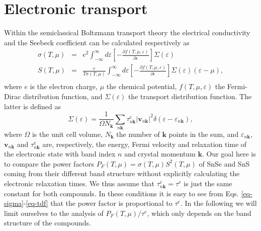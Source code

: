 \section{Electronic transport}

Within the semiclassical Boltzmann transport theory\cite{scheidemantel2003transport} the electrical conductivity and the Seebeck coefficient can be calculated respectively as
\begin{eqnarray}
 \sigma(T,\mu) & = & e^2 \int_{-\infty}^{\infty} d\varepsilon \left[-\frac{\partial f(T,\mu,\varepsilon)}{\partial\epsilon}\right] \Sigma(\varepsilon) 
 \label{eq-sigma}\\
 S(T,\mu) & = & \frac{e}{T\sigma(T,\mu)} \int_{-\infty}^{\infty} d\varepsilon \left[-\frac{\partial f(T,\mu,\varepsilon)}{\partial\epsilon}\right] \Sigma(\varepsilon) (\varepsilon - \mu), \nonumber \\
\label{eq-s}
\end{eqnarray}
where $e$ is the electron charge,  $\mu$ the chemical potential, $ f(T,\mu,\varepsilon)$ the Fermi-Dirac distribution function, and $\Sigma(\varepsilon)$ the transport distribution function. The latter is defined as
\begin{equation}
\Sigma(\varepsilon) = \frac{1}{\Omega N_{\mathbf{k}}} \sum_{n\mathbf{k}} \tau^e_{n\mathbf{k}}  |\mathbf{v}_{n\mathbf{k}}|^{2} \delta( \varepsilon-\varepsilon_{n\mathbf{k}} ), 
\label{eq-tdf}
\end{equation}
where $\Omega$ is the unit cell volume, $N_{\mathbf{k}}$ the number of $\mathbf{k}$ points in the sum, and $\varepsilon_{n\mathbf{k}} $, $\mathbf{v}_{n\mathbf{k}} $ and  $\tau^e_{n\mathbf{k}}$ are, respectively, the energy, Fermi
velocity and relaxation time of the electronic state with band index $n$ and crystal momentum $\mathbf{k}$. Our goal here is to compare the power factors $P_{F}(T,\mu)=\sigma(T,\mu) S^2(T,\mu)$ of SnSe and SnS coming from
their different band structure without explicitly calculating the electronic relaxation times. We thus assume that $\tau^e_{n\mathbf{k}}=\tau^e$ is just the same constant for both compounds. In these conditions it is easy to see
from Eqs. \eqref{eq-sigma}-\eqref{eq-tdf} that the power factor is proportional to $\tau^e$.  In the following we will limit ourselves to the analysis of $P_{F}(T,\mu)/\tau^e$, which only depends on the band
structure of the compounds. \\


